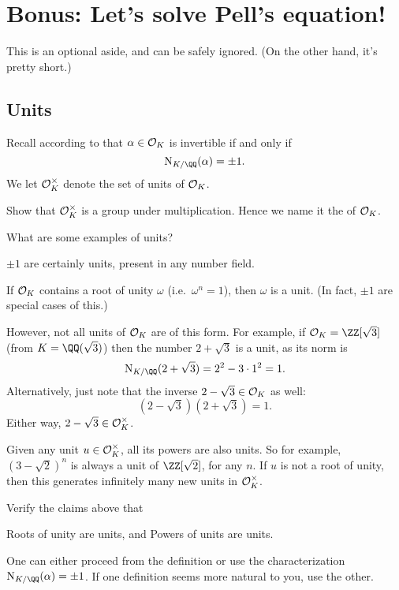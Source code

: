 \chapter{Bonus: Let's solve Pell's equation!}
This is an optional aside, and can be safely ignored.
(On the other hand, it's pretty short.)

\section{Units}
Recall according to  that $\alpha \in \mathcal O_K$ is invertible
if and only if \[ \NK(\alpha) = \pm 1. \]
We let $\mathcal O_K^\times$ denote the set of units of $\mathcal O_K$.

\begin{ques}
	Show that $\mathcal O_K^\times$ is a group under multiplication.
	Hence we name it the  of $\mathcal O_K$.
\end{ques}

What are some examples of units?
\begin{example}
	\listhack
	\begin{enumerate}
		\ii $\pm 1$ are certainly units, present in any number field.

		\ii If $\mathcal O_K$ contains a root of unity $\omega$ (i.e.\ $\omega^n=1$),
		then $\omega$ is a unit.
		(In fact, $\pm 1$ are special cases of this.)

		\ii However, not all units of $\mathcal O_K$ are of this form.
		For example, if $\OO_K = \ZZ[\sqrt3]$ (from $K = \QQ(\sqrt3)$) then
		the number $2+\sqrt3$ is a unit, as its norm is
		\[ \NK(2+\sqrt3) = 2^2 - 3 \cdot 1^2 = 1. \]
		Alternatively, just note that the inverse $2-\sqrt3 \in \mathcal O_K$ as well:
		\[ \left( 2-\sqrt3 \right)\left( 2+\sqrt3 \right) = 1. \]
		Either way, $2-\sqrt3 \in \mathcal O_K^\times$.

		\ii Given any unit $u \in \mathcal O_K^\times$, all its powers are also units.
		So for example, $(3-\sqrt2)^n$ is always a unit of $\ZZ[\sqrt2]$, for any $n$.
		If $u$ is not a root of unity, then this generates infinitely many new units in $\mathcal O_K^\times$.
	\end{enumerate}
\end{example}

\begin{ques}
	Verify the claims above that
	\begin{enumerate}[(a)]
		\ii Roots of unity are units, and
		\ii Powers of units are units.
	\end{enumerate}
	One can either proceed from the definition
	or use the characterization $\NK(\alpha) = \pm 1$.
	If one definition seems more natural to you, use the other.
\end{ques}

